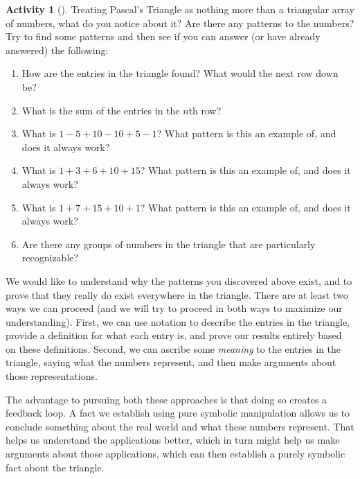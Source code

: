 \documentclass[10pt,]{book}
\theoremstyle{plain}
\theoremstyle{definition}
\theoremstyle{definition}
\theoremstyle{definition}
\newtheorem{activity}[project]{Activity}
\numberwithin{equation}{chapter}
\begin{document}
\begin{activity}[]\label{activity-56}
\hypertarget{p-473}{}%
Treating Pascal's Triangle as nothing more than a triangular array of numbers, what do you notice about it?  Are there any patterns to the numbers? Try to find some patterns and then see if you can answer (or have already answered) the following:%
\begin{enumerate}[font=\bfseries,label=(\alph*),ref=\alph*]
\item\label{task-70} \hypertarget{p-474}{}%
How are the entries in the triangle found?  What would the next row down be?%
\item\label{task-71} \hypertarget{p-475}{}%
What is the sum of the entries in the \(n\)th row?%
\item\label{task-72} \hypertarget{p-476}{}%
What is \(1 - 5 + 10 - 10 + 5 - 1\)?  What pattern is this an example of, and does it always work?%
\item\label{task-73} \hypertarget{p-477}{}%
What is \(1 + 3 + 6 + 10 + 15\)?  What pattern is this an example of, and does it always work?%
\item\label{task-74} \hypertarget{p-478}{}%
What is \(1+ 7 + 15 + 10 + 1\)?  What pattern is this an example of, and does it always work?%
\item\label{task-75} \hypertarget{p-479}{}%
Are there any groups of numbers in the triangle that are particularly recognizable?%
\end{enumerate}
\end{activity}
\hypertarget{p-480}{}%
We would like to understand why the patterns you discovered above exist, and to prove that they really do exist everywhere in the triangle.  There are at least two ways we can proceed (and we will try to proceed in both ways to maximize our understanding).  First, we can use notation to describe the entries in the triangle, provide a definition for what each entry is, and prove our results entirely based on these definitions.  Second, we can ascribe some \emph{meaning} to the entries in the triangle, saying what the numbers represent, and then make arguments about those representations.%
\par
\hypertarget{p-481}{}%
 The advantage to pursuing both these approaches is that doing so creates a feedback loop.  A fact we establish using pure symbolic manipulation allows us to conclude something about the real world and what these numbers represent.  That helps us understand the applications better, which in turn might help us make arguments about those applications, which can then establish a purely symbolic fact about the triangle.%
\end{document}
